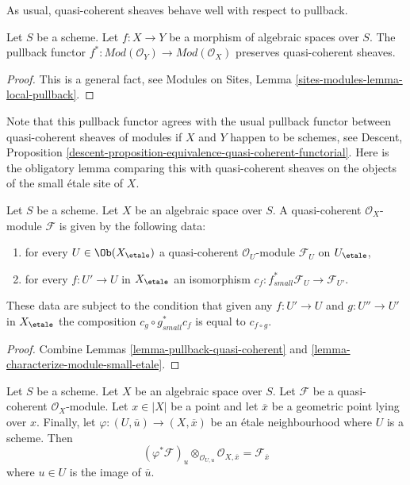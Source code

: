 \medskip\noindent
As usual, quasi-coherent sheaves behave well with respect to pullback.

\begin{lemma}
\label{lemma-pullback-quasi-coherent}
Let $S$ be a scheme.
Let $f : X \to Y$ be a morphism of algebraic spaces over $S$.
The pullback functor
$f^* : \textit{Mod}(\mathcal{O}_Y) \to \textit{Mod}(\mathcal{O}_X)$
preserves quasi-coherent sheaves.
\end{lemma}

\begin{proof}
This is a general fact, see
Modules on Sites, Lemma \ref{sites-modules-lemma-local-pullback}.
\end{proof}

\noindent
Note that this pullback functor agrees with the usual pullback functor
between quasi-coherent sheaves of modules if $X$ and $Y$ happen to be
schemes, see
Descent, Proposition
\ref{descent-proposition-equivalence-quasi-coherent-functorial}.
Here is the obligatory lemma comparing this with quasi-coherent sheaves
on the objects of the small \'etale site of $X$.

\begin{lemma}
\label{lemma-characterize-quasi-coherent-small-etale}
Let $S$ be a scheme. Let $X$ be an algebraic space over $S$.
A quasi-coherent $\mathcal{O}_X$-module $\mathcal{F}$
is given by the following data:
\begin{enumerate}
\item for every $U \in \Ob(X_\etale)$ a quasi-coherent
$\mathcal{O}_U$-module $\mathcal{F}_U$ on $U_\etale$,
\item for every $f : U' \to U$ in $X_\etale$ an isomorphism
$c_f : f_{small}^*\mathcal{F}_U \to \mathcal{F}_{U'}$.
\end{enumerate}
These data are subject to the condition that given any $f : U' \to U$
and $g : U'' \to U'$ in $X_\etale$ the composition
$c_g \circ g_{small}^*c_f$ is equal to $c_{f \circ g}$.
\end{lemma}

\begin{proof}
Combine Lemmas \ref{lemma-pullback-quasi-coherent} and
\ref{lemma-characterize-module-small-etale}.
\end{proof}

\begin{lemma}
\label{lemma-stalk-quasi-coherent}
Let $S$ be a scheme.
Let $X$ be an algebraic space over $S$.
Let $\mathcal{F}$ be a quasi-coherent $\mathcal{O}_X$-module.
Let $x \in |X|$ be a point and let $\overline{x}$ be a geometric
point lying over $x$. Finally, let
$\varphi : (U, \overline{u}) \to (X, \overline{x})$
be an \'etale neighbourhood where $U$ is a scheme.
Then
$$
(\varphi^*\mathcal{F})_u \otimes_{\mathcal{O}_{U, u}}
\mathcal{O}_{X, \overline{x}} =
\mathcal{F}_{\overline{x}}
$$
where $u \in U$ is the image of $\overline{u}$.
\end{lemma}

